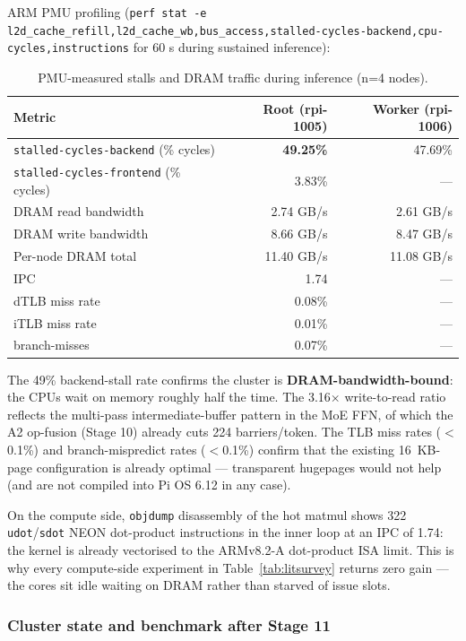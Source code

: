 \documentclass[10pt,a4paper]{article}
\begin{document}
ARM PMU profiling (\texttt{perf stat -e l2d\_cache\_refill,\allowbreak l2d\_cache\_wb,\allowbreak bus\_access,\allowbreak stalled-cycles-backend,\allowbreak cpu-cycles,\allowbreak instructions} for 60 s during sustained inference):

\begin{table}[H]
\centering
\small
\caption{PMU-measured stalls and DRAM traffic during inference (n=4 nodes).}
\begin{tabular}{lrr}
\toprule
\textbf{Metric} & \textbf{Root (rpi-1005)} & \textbf{Worker (rpi-1006)} \\
\midrule
\texttt{stalled-cycles-backend} (\% cycles) & \textbf{49.25\%} & 47.69\% \\
\texttt{stalled-cycles-frontend} (\% cycles) & 3.83\% & --- \\
DRAM read bandwidth & 2.74 GB/s & 2.61 GB/s \\
DRAM write bandwidth & 8.66 GB/s & 8.47 GB/s \\
Per-node DRAM total & 11.40 GB/s & 11.08 GB/s \\
IPC & 1.74 & --- \\
dTLB miss rate & 0.08\% & --- \\
iTLB miss rate & 0.01\% & --- \\
branch-misses & 0.07\% & --- \\
\bottomrule
\end{tabular}
\end{table}

The 49\% backend-stall rate confirms the cluster is \textbf{DRAM-bandwidth-bound}: the CPUs wait on memory roughly half the time. The 3.16$\times$ write-to-read ratio reflects the multi-pass intermediate-buffer pattern in the MoE FFN, of which the A2 op-fusion (Stage 10) already cuts 224 barriers/token. The TLB miss rates ($<$0.1\%) and branch-mispredict rates ($<$0.1\%) confirm that the existing 16~KB-page configuration is already optimal --- transparent hugepages would not help (and are not compiled into Pi OS 6.12 in any case).

On the compute side, \texttt{objdump} disassembly of the hot matmul shows 322 \texttt{udot}/\texttt{sdot} NEON dot-product instructions in the inner loop at an IPC of 1.74: the kernel is already vectorised to the ARMv8.2-A dot-product ISA limit. This is why every compute-side experiment in Table~\ref{tab:litsurvey} returns zero gain --- the cores sit idle waiting on DRAM rather than starved of issue slots.

\subsubsection{Cluster state and benchmark after Stage 11}
\end{document}

